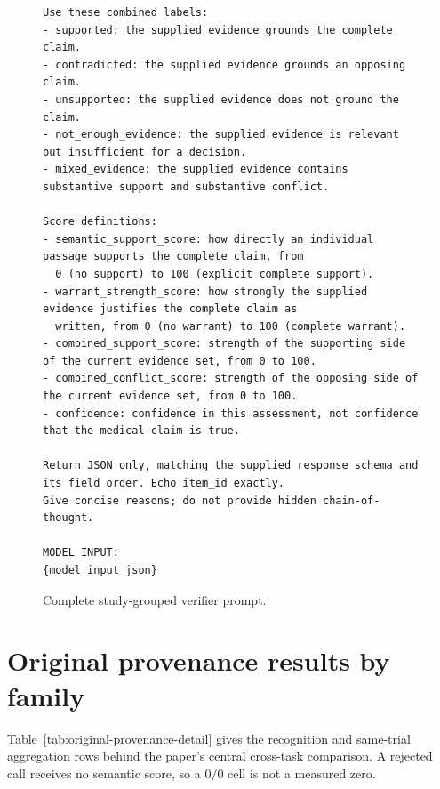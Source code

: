 \documentclass[11pt]{article}
\begin{document}
\begin{figure}[p]
\begin{minipage}{0.96\textwidth}
\begin{lstlisting}[style=paperprompt]
Use these combined labels:
- supported: the supplied evidence grounds the complete claim.
- contradicted: the supplied evidence grounds an opposing claim.
- unsupported: the supplied evidence does not ground the claim.
- not_enough_evidence: the supplied evidence is relevant but insufficient for a decision.
- mixed_evidence: the supplied evidence contains substantive support and substantive conflict.

Score definitions:
- semantic_support_score: how directly an individual passage supports the complete claim, from
  0 (no support) to 100 (explicit complete support).
- warrant_strength_score: how strongly the supplied evidence justifies the complete claim as
  written, from 0 (no warrant) to 100 (complete warrant).
- combined_support_score: strength of the supporting side of the current evidence set, from 0 to 100.
- combined_conflict_score: strength of the opposing side of the current evidence set, from 0 to 100.
- confidence: confidence in this assessment, not confidence that the medical claim is true.

Return JSON only, matching the supplied response schema and its field order. Echo item_id exactly.
Give concise reasons; do not provide hidden chain-of-thought.

MODEL INPUT:
{model_input_json}
\end{lstlisting}
\end{minipage}
\caption{Complete study-grouped verifier prompt.}
\label{fig:grouped-prompt}
\end{figure}

\Needspace{0.35\textheight}

\section{Original provenance results by family}
\label{app:provenance-detail}

Table~\ref{tab:original-provenance-detail} gives the recognition and same-trial aggregation rows behind the paper's central cross-task comparison. A rejected call receives no semantic score, so a $0/0$ cell is not a measured zero.
\end{document}

